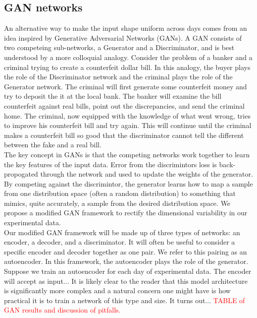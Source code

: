 \documentclass[12pt]{article}
\begin{document}
\subsection{GAN networks}
An alternative way to make the input shape uniform across days comes from an idea inspired by Generative Adversarial Networks (GANs). A GAN consists of two competeing sub-networks, a Generator and a Discriminator, and is best understood by a more colloquial analogy. Consider the problem of a banker and a criminal trying to create a counterfeit dollar bill. In this analogy, the buyer plays the role of the Discriminator network and the criminal plays the role of the Generator network. The criminal will first generate some counterfeit money and try to deposit the it at the local bank. The banker will examine the bill counterfeit against real bills, point out the discrepancies, and send the criminal home. The criminal, now equipped with the knowledge of what went wrong, tries to improve his counterfeit bill and try again. This will continue until the criminal makes a counterfeit bill so good that the discriminator cannot tell the different between the fake and a real bill. \\
The key concept in GANs is that the competing networks work together to learn the key features of the input data. Error from the discrimintors loss is back-propogated through the network and used to update the weights of the generator. By competing against the discrimintor, the generator learns how to map a sample from one distribution space (often a random distribution) to something that mimics, quite accurately, a sample from the desired distribution space. We propose a modified GAN framework to rectify the dimensional variability in our experimental data. \\
\indent Our modified GAN framework will be made up of three types of networks: an encoder, a decoder, and a discriminator. It will often be useful to consider a specific encoder and decoder together as one pair. We refer to this pairing as an autoencoder. In this framework, the autoencoder plays the role of the generator. Suppose we train an autoencoder for each day of experimental data. The encoder will accept as input...
It is likely clear to the reader that this model architecture is significantly more complex and a natural concern one might have is how practical it is to train a network of this type and size. It turns out...
\textcolor{red}{TABLE of GAN results and discussion of pitfalls.}
\end{document}
